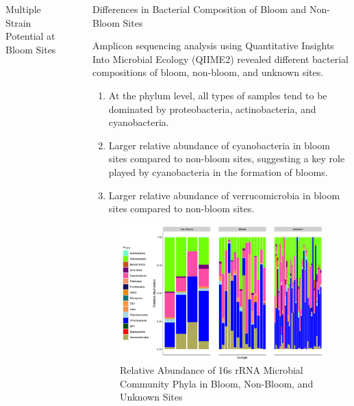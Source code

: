 \documentclass[final]{beamer}
\newlength{\sepwidth}
\newlength{\colwidth}
\newcommand{\separatorcolumn}{\begin{column}{\sepwidth}\end{column}}
\begin{document}
\begin{frame}[t]
\begin{columns}[t]
\begin{column}{\colwidth}
\begin{block}{Multiple Strain Potential at Bloom Sites}
  \end{block}

\end{column}

\separatorcolumn

\begin{column}{\colwidth}

  \begin{block}{Differences in Bacterial Composition of Bloom and Non-Bloom Sites}
  
  Amplicon sequencing analysis using Quantitative Insights Into Microbial Ecology (QIIME2) revealed different bacterial
  compositions of bloom, non-bloom, and unknown sites.
  
  \begin{enumerate}[$\Rightarrow$]
  \item At the phylum level, all types of samples tend to be dominated by proteobacteria, actinobacteria, and cyanobacteria.
  \item Larger relative abundance of cyanobacteria in bloom sites compared to non-bloom sites, suggesting a key role played by cyanobacteria in the formation of blooms.
  \item Larger relative abundance of verrucomicrobia in bloom sites compared to non-bloom sites.
  \end{enumerate}
  
   \begin{figure}
      \centering
      \includegraphics[width=\textwidth]{16s_phyla.png}
      \caption{Relative Abundance of 16s rRNA Microbial Community Phyla in Bloom, Non-Bloom, and Unknown Sites}
    \end{figure}


\end{block}
\end{column}
\end{columns}
\end{frame}
\end{document}

